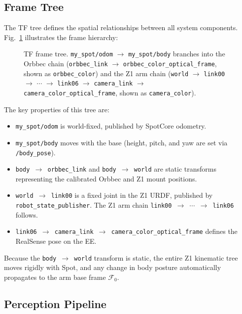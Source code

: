 \subsection{Frame Tree}

The \ac{TF} tree defines the spatial relationships between all system
components. Fig.~\ref{fig:frame_tree} illustrates the frame hierarchy:

\begin{figure}[t]
  \centering
  
  \caption{\ac{TF} frame tree. \texttt{my\_spot/odom}
           $\to$ \texttt{my\_spot/body} branches into the Orbbec chain
           (\texttt{orbbec\_link} $\to$ \texttt{orbbec\_color\_optical\_frame},
           shown as \texttt{orbbec\_color}) and the Z1 arm chain
           (\texttt{world} $\to$ \texttt{link00} $\to$ $\cdots$
           $\to$ \texttt{link06} $\to$ \texttt{camera\_link}
           $\to$ \texttt{camera\_color\_optical\_frame},
           shown as \texttt{camera\_color}).}
  \label{fig:frame_tree}
\end{figure}

The key properties of this tree are:
\begin{itemize}
  \item \texttt{my\_spot/odom} is world-fixed, published by SpotCore
        odometry.
  \item \texttt{my\_spot/body} moves with the base (height, pitch, and yaw
        are set via \texttt{/body\_pose}).
  \item \texttt{body $\to$ orbbec\_link} and \texttt{body $\to$ world} are
        static transforms representing the calibrated Orbbec and Z1 mount
        positions.
  \item \texttt{world $\to$ link00} is a fixed joint in the Z1 URDF,
        published by \texttt{robot\_state\_publisher}. The Z1 arm chain
        \texttt{link00 $\to$ $\cdots$ $\to$ link06} follows.
  \item \texttt{link06 $\to$ camera\_link $\to$ camera\_color\_optical\_frame}
        defines the RealSense pose on the \ac{EE}.
\end{itemize}
Because the \texttt{body $\to$ world} transform is static, the entire Z1
kinematic tree moves rigidly with Spot, and any change in body posture
automatically propagates to the arm base frame $\mathcal{F}_0$.

\subsection{Perception Pipeline}

